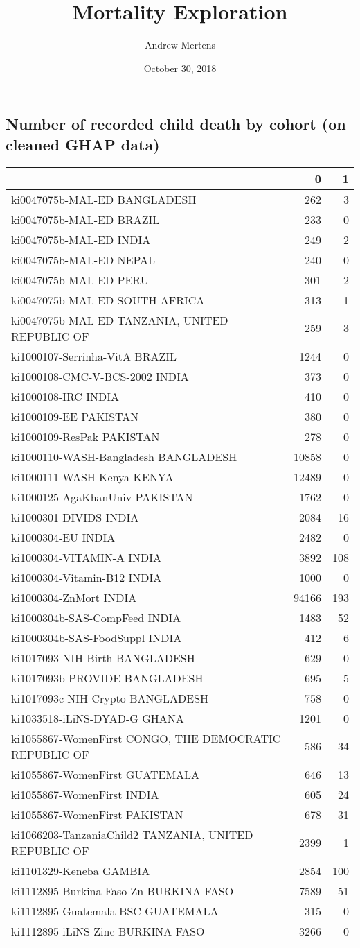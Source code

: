 \documentclass[]{article}
\title{Mortality Exploration}
\author{Andrew Mertens}
\date{October 30, 2018}
\begin{document}
\maketitle

\subsection{Number of recorded child death by cohort (on cleaned GHAP
data)}\label{number-of-recorded-child-death-by-cohort-on-cleaned-ghap-data}

\begin{longtable}[]{@{}lrr@{}}
\toprule
& 0 & 1\tabularnewline
\midrule
\endhead
ki0047075b-MAL-ED BANGLADESH & 262 & 3\tabularnewline
ki0047075b-MAL-ED BRAZIL & 233 & 0\tabularnewline
ki0047075b-MAL-ED INDIA & 249 & 2\tabularnewline
ki0047075b-MAL-ED NEPAL & 240 & 0\tabularnewline
ki0047075b-MAL-ED PERU & 301 & 2\tabularnewline
ki0047075b-MAL-ED SOUTH AFRICA & 313 & 1\tabularnewline
ki0047075b-MAL-ED TANZANIA, UNITED REPUBLIC OF & 259 & 3\tabularnewline
ki1000107-Serrinha-VitA BRAZIL & 1244 & 0\tabularnewline
ki1000108-CMC-V-BCS-2002 INDIA & 373 & 0\tabularnewline
ki1000108-IRC INDIA & 410 & 0\tabularnewline
ki1000109-EE PAKISTAN & 380 & 0\tabularnewline
ki1000109-ResPak PAKISTAN & 278 & 0\tabularnewline
ki1000110-WASH-Bangladesh BANGLADESH & 10858 & 0\tabularnewline
ki1000111-WASH-Kenya KENYA & 12489 & 0\tabularnewline
ki1000125-AgaKhanUniv PAKISTAN & 1762 & 0\tabularnewline
ki1000301-DIVIDS INDIA & 2084 & 16\tabularnewline
ki1000304-EU INDIA & 2482 & 0\tabularnewline
ki1000304-VITAMIN-A INDIA & 3892 & 108\tabularnewline
ki1000304-Vitamin-B12 INDIA & 1000 & 0\tabularnewline
ki1000304-ZnMort INDIA & 94166 & 193\tabularnewline
ki1000304b-SAS-CompFeed INDIA & 1483 & 52\tabularnewline
ki1000304b-SAS-FoodSuppl INDIA & 412 & 6\tabularnewline
ki1017093-NIH-Birth BANGLADESH & 629 & 0\tabularnewline
ki1017093b-PROVIDE BANGLADESH & 695 & 5\tabularnewline
ki1017093c-NIH-Crypto BANGLADESH & 758 & 0\tabularnewline
ki1033518-iLiNS-DYAD-G GHANA & 1201 & 0\tabularnewline
ki1055867-WomenFirst CONGO, THE DEMOCRATIC REPUBLIC OF & 586 &
34\tabularnewline
ki1055867-WomenFirst GUATEMALA & 646 & 13\tabularnewline
ki1055867-WomenFirst INDIA & 605 & 24\tabularnewline
ki1055867-WomenFirst PAKISTAN & 678 & 31\tabularnewline
ki1066203-TanzaniaChild2 TANZANIA, UNITED REPUBLIC OF & 2399 &
1\tabularnewline
ki1101329-Keneba GAMBIA & 2854 & 100\tabularnewline
ki1112895-Burkina Faso Zn BURKINA FASO & 7589 & 51\tabularnewline
ki1112895-Guatemala BSC GUATEMALA & 315 & 0\tabularnewline
ki1112895-iLiNS-Zinc BURKINA FASO & 3266 & 0\tabularnewline

\end{longtable}
\end{document}
